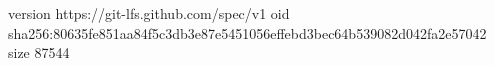 version https://git-lfs.github.com/spec/v1
oid sha256:80635fe851aa84f5c3db3e87e5451056effebd3bec64b539082d042fa2e57042
size 87544
